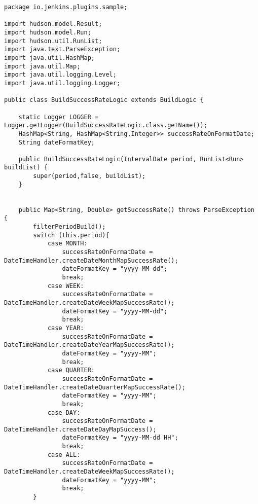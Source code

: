\begin{lstlisting}
package io.jenkins.plugins.sample;

import hudson.model.Result;
import hudson.model.Run;
import hudson.util.RunList;
import java.text.ParseException;
import java.util.HashMap;
import java.util.Map;
import java.util.logging.Level;
import java.util.logging.Logger;

public class BuildSuccessRateLogic extends BuildLogic {

    static Logger LOGGER = Logger.getLogger(BuildSuccessRateLogic.class.getName());
    HashMap<String, HashMap<String,Integer>> successRateOnFormatDate;
    String dateFormatKey;

    public BuildSuccessRateLogic(IntervalDate period, RunList<Run> buildList) {
        super(period,false, buildList);
    }


    public Map<String, Double> getSuccessRate() throws ParseException {
        filterPeriodBuild();
        switch (this.period){
            case MONTH:
                successRateOnFormatDate = DateTimeHandler.createDateMonthMapSuccessRate();
                dateFormatKey = "yyyy-MM-dd";
                break;
            case WEEK:
                successRateOnFormatDate = DateTimeHandler.createDateWeekMapSuccessRate();
                dateFormatKey = "yyyy-MM-dd";
                break;
            case YEAR:
                successRateOnFormatDate = DateTimeHandler.createDateYearMapSuccessRate();
                dateFormatKey = "yyyy-MM";
                break;
            case QUARTER:
                successRateOnFormatDate = DateTimeHandler.createDateQuarterMapSuccessRate();
                dateFormatKey = "yyyy-MM";
                break;
            case DAY:
                successRateOnFormatDate = DateTimeHandler.createDateDayMapSuccess();
                dateFormatKey = "yyyy-MM-dd HH";
                break;
            case ALL:
                successRateOnFormatDate = DateTimeHandler.createDateWeekMapSuccessRate();
                dateFormatKey = "yyyy-MM";
                break;
        }


\end{lstlisting}
